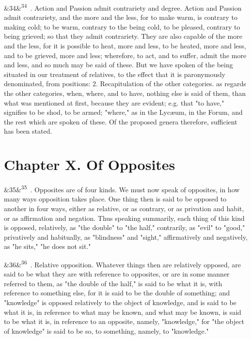 \documentclass[12pt]{article}
\newcommand{\para}[1][]{\par\noindent\ifx&#1&\else\textsuperscript{\footnotesize #1}~\fi}
\begin{document}
\para[34] 1. Action and Passion admit contrariety and degree. Action and Passion admit contrariety, and the more and the less, for to make warm, is contrary to making cold; to be warm, contrary to the being cold, to be pleased, contrary to being grieved; so that they admit contrariety. They are also capable of the more and the less, for it is possible to heat, more and less, to be heated, more and less, and to be grieved, more and less; wherefore, to act, and to suffer, admit the more and less, and so much may be said of these. But we have spoken of the being situated in our treatment of relatives, to the effect that it is paronymously denominated, from positions: 2. Recapitulation of the other categories. as regards the other categories, when, where, and to have, nothing else is said of them, than what was mentioned at first, because they are evident; e.g. that "to have," signifies to be shod, to be armed; "where," as in the Lycæum, in the Forum, and the rest which are spoken of these. Of the proposed genera therefore, sufficient has been stated.

\section*{Chapter X. Of Opposites}

\para[35] 1. Opposites are of four kinds. We must now speak of opposites, in how many ways opposition takes place. One thing then is said to be opposed to another in four ways, either as relative, or as contrary, or as privation and habit, or as affirmation and negation. Thus speaking summarily, each thing of this kind is opposed, relatively, as "the double" to "the half," contrarily, as "evil" to "good," privatively and habitually, as "blindness" and "sight," affirmatively and negatively, as "he sits," "he does not sit."

\para[36] 1. Relative opposition. Whatever things then are relatively opposed, are said to be what they are with reference to opposites, or are in some manner referred to them, as "the double of the half," is said to be what it is, with reference to something else, for it is said to be the double of something; and "knowledge" is opposed relatively to the object of knowledge, and is said to be what it is, in reference to what may be known, and what may be known, is said to be what it is, in reference to an opposite, namely, "knowledge," for "the object of knowledge" is said to be so, to something, namely, to "knowledge."
\end{document}
